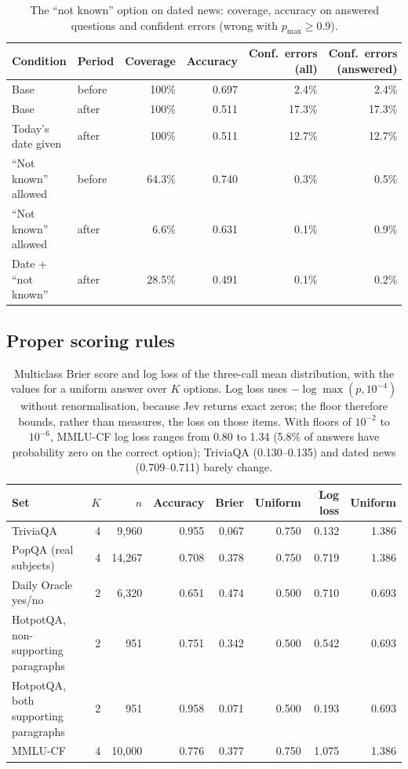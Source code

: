 \documentclass[10pt,twocolumn]{article}
\newcommand{\pmax}{p_{\max}}
\begin{document}
\begin{table}[h]
\centering\small
\caption{The ``not known'' option on dated news: coverage, accuracy on
answered questions and confident errors (wrong with $\pmax\ge0.9$).}
\label{tab:coverage}
\begin{tabular}{@{}l l r r r r@{}}
\toprule
Condition & Period & Coverage & Accuracy & Conf.\ errors (all) & Conf.\ errors (answered) \\
\midrule
Base & before & 100\% & 0.697 & 2.4\% & 2.4\% \\
Base & after & 100\% & 0.511 & 17.3\% & 17.3\% \\
Today's date given & after & 100\% & 0.511 & 12.7\% & 12.7\% \\
``Not known'' allowed & before & 64.3\% & 0.740 & 0.3\% & 0.5\% \\
``Not known'' allowed & after & 6.6\% & 0.631 & 0.1\% & 0.9\% \\
Date + ``not known'' & after & 28.5\% & 0.491 & 0.1\% & 0.2\% \\
\bottomrule
\end{tabular}
\end{table}

\subsection{Proper scoring rules}
\label{app:scores}

\begin{table}[h]
\centering\small
\caption{Multiclass Brier score and log loss of the three-call mean
distribution, with the values for a uniform answer over $K$ options. Log loss
uses $-\log\max(p,10^{-4})$ without renormalisation, because Jev returns exact
zeros; the floor therefore bounds, rather than measures, the loss on those
items. With floors of $10^{-2}$ to $10^{-6}$, MMLU-CF log loss ranges from 0.80
to 1.34 (5.8\% of answers have probability zero on the correct option);
TriviaQA (0.130--0.135) and dated news (0.709--0.711) barely change.}
\label{tab:scores}
\begin{tabular}{@{}l r r r r r r r@{}}
\toprule
Set & $K$ & $n$ & Accuracy & Brier & Uniform & Log loss & Uniform \\
\midrule
TriviaQA & 4 & 9{,}960 & 0.955 & 0.067 & 0.750 & 0.132 & 1.386 \\
PopQA (real subjects) & 4 & 14{,}267 & 0.708 & 0.378 & 0.750 & 0.719 & 1.386 \\
Daily Oracle yes/no & 2 & 6{,}320 & 0.651 & 0.474 & 0.500 & 0.710 & 0.693 \\
HotpotQA, non-supporting paragraphs & 2 & 951 & 0.751 & 0.342 & 0.500 & 0.542 & 0.693 \\
HotpotQA, both supporting paragraphs & 2 & 951 & 0.958 & 0.071 & 0.500 & 0.193 & 0.693 \\
MMLU-CF & 4 & 10{,}000 & 0.776 & 0.377 & 0.750 & 1.075 & 1.386 \\
\bottomrule
\end{tabular}
\end{table}
\end{document}
